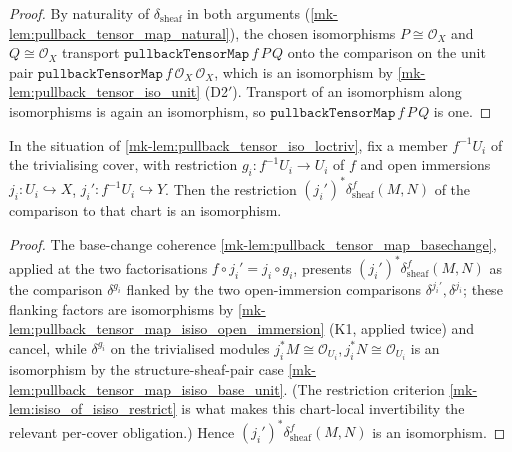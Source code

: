 \begin{proof}
  \leanok
  By naturality of \(\delta_{\mathrm{sheaf}}\) in both arguments
  (\ref{mk-lem:pullback_tensor_map_natural}), the chosen isomorphisms
  \(P \cong \mathcal{O}_X\) and \(Q \cong \mathcal{O}_X\) transport
  \(\mathtt{pullbackTensorMap}\,f\,P\,Q\) onto the comparison on the unit pair
  \(\mathtt{pullbackTensorMap}\,f\,\mathcal{O}_X\,\mathcal{O}_X\), which is an isomorphism by
  \ref{mk-lem:pullback_tensor_iso_unit} (D2$'$). Transport of an isomorphism along
  isomorphisms is again an isomorphism, so \(\mathtt{pullbackTensorMap}\,f\,P\,Q\) is one.
\end{proof}

\begin{lemma}\label{mk-lem:chart_isiso}
  \leanok

  In the situation of \ref{mk-lem:pullback_tensor_iso_loctriv}, fix a member \(f^{-1}U_i\) of
  the trivialising cover, with restriction \(g_i : f^{-1}U_i \to U_i\) of \(f\) and open
  immersions \(j_i : U_i \hookrightarrow X\), \(j_i' : f^{-1}U_i \hookrightarrow Y\). Then the
  restriction \((j_i')^*\delta^{f}_{\mathrm{sheaf}}(M,N)\) of the comparison to that chart is
  an isomorphism.
\end{lemma}

\begin{proof}
  \leanok
  The base-change coherence \ref{mk-lem:pullback_tensor_map_basechange}, applied at the two
  factorisations \(f \circ j_i' = j_i \circ g_i\), presents
  \((j_i')^*\delta^{f}_{\mathrm{sheaf}}(M,N)\) as the comparison \(\delta^{g_i}\) flanked by
  the two open-immersion comparisons \(\delta^{j_i'}, \delta^{j_i}\); these flanking factors
  are isomorphisms by \ref{mk-lem:pullback_tensor_map_isiso_open_immersion} (K1, applied twice)
  and cancel, while \(\delta^{g_i}\) on the trivialised modules
  \(j_i^*M \cong \mathcal{O}_{U_i}, j_i^*N \cong \mathcal{O}_{U_i}\) is an isomorphism by the
  structure-sheaf-pair case \ref{mk-lem:pullback_tensor_map_isiso_base_unit}. (The
  restriction criterion \ref{mk-lem:isiso_of_isiso_restrict} is what makes this chart-local
  invertibility the relevant per-cover obligation.) Hence
  \((j_i')^*\delta^{f}_{\mathrm{sheaf}}(M,N)\) is an isomorphism.
\end{proof}

